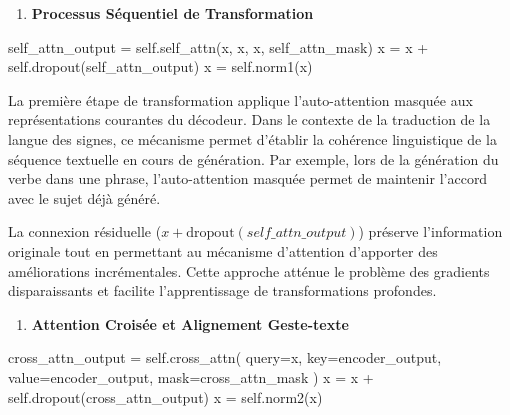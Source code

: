 \documentclass[12pt]{article}
\providecommand{\tightlist}{%
      \setlength{\itemsep}{0pt}\setlength{\parskip}{0pt}}
\newenvironment{Shaded}{}{}
\newcommand{\NormalTok}[1]{{#1}}
\newcommand{\VariableTok}[1]{\textcolor[rgb]{0.10,0.09,0.49}{{#1}}}
\newcommand{\OperatorTok}[1]{\textcolor[rgb]{0.40,0.40,0.40}{{#1}}}
\begin{document}
\begin{enumerate}
\def\labelenumi{\arabic{enumi}.}
\setcounter{enumi}{3}
\tightlist
\item
  \textbf{Processus Séquentiel de Transformation}
\end{enumerate}

\begin{Shaded}
\begin{Highlighting}[]
\NormalTok{self\_attn\_output }\OperatorTok{=} \VariableTok{self}\NormalTok{.self\_attn(x, x, x, self\_attn\_mask)}
\NormalTok{x }\OperatorTok{=}\NormalTok{ x }\OperatorTok{+} \VariableTok{self}\NormalTok{.dropout(self\_attn\_output)}
\NormalTok{x }\OperatorTok{=} \VariableTok{self}\NormalTok{.norm1(x)}
\end{Highlighting}
\end{Shaded}

La première étape de transformation applique l'auto-attention masquée
aux représentations courantes du décodeur. Dans le contexte de la
traduction de la langue des signes, ce mécanisme permet d'établir la
cohérence linguistique de la séquence textuelle en cours de génération.
Par exemple, lors de la génération du verbe dans une phrase,
l'auto-attention masquée permet de maintenir l'accord avec le sujet déjà
généré.

La connexion résiduelle (\(x + \text{dropout}(self\_attn\_output)\))
préserve l'information originale tout en permettant au mécanisme
d'attention d'apporter des améliorations incrémentales. Cette approche
atténue le problème des gradients disparaissants et facilite
l'apprentissage de transformations profondes.

\begin{enumerate}
\def\labelenumi{\arabic{enumi}.}
\setcounter{enumi}{4}
\tightlist
\item
  \textbf{Attention Croisée et Alignement Geste-texte}
\end{enumerate}

\begin{Shaded}
\begin{Highlighting}[]
\NormalTok{cross\_attn\_output }\OperatorTok{=} \VariableTok{self}\NormalTok{.cross\_attn(}
\NormalTok{    query}\OperatorTok{=}\NormalTok{x, key}\OperatorTok{=}\NormalTok{encoder\_output, value}\OperatorTok{=}\NormalTok{encoder\_output,}
\NormalTok{    mask}\OperatorTok{=}\NormalTok{cross\_attn\_mask}
\NormalTok{)}
\NormalTok{x }\OperatorTok{=}\NormalTok{ x }\OperatorTok{+} \VariableTok{self}\NormalTok{.dropout(cross\_attn\_output)}
\NormalTok{x }\OperatorTok{=} \VariableTok{self}\NormalTok{.norm2(x)}
\end{Highlighting}
\end{Shaded}
\end{document}
